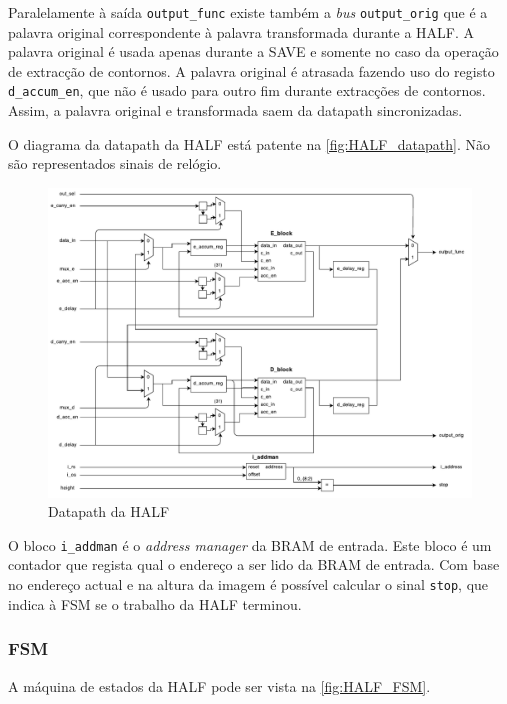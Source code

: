 \documentclass[a4paper]{article}
\begin{document}
Paralelamente à saída \texttt{output\_func} existe também a \textit{bus} \texttt{output\_orig} que é a palavra original correspondente à palavra transformada durante a HALF. A palavra original é usada apenas durante a SAVE e somente no caso da operação de extracção de contornos. A palavra original é atrasada fazendo uso do registo \texttt{d\_accum\_en}, que não é usado para outro fim durante extracções de contornos. Assim, a palavra original e transformada saem da datapath sincronizadas.

O diagrama da datapath da HALF está patente na \autoref{fig:HALF_datapath}. Não são representados sinais de relógio.

\begin{figure}[H]
	\centerline{
		\includegraphics[width=.95\paperwidth]{HALF_datapath}
	}
	\caption{Datapath da HALF}
	\label{fig:HALF_datapath}
\end{figure}

O bloco \texttt{i\_addman} é o \textit{address manager} da BRAM de entrada. Este bloco é um contador que regista qual o endereço a ser lido da BRAM de entrada. Com base no endereço actual e na altura da imagem é possível calcular o sinal \texttt{stop}, que indica à FSM se o trabalho da HALF terminou.

\subsubsection{FSM}
A máquina de estados da HALF pode ser vista na \autoref{fig:HALF_FSM}.
\end{document}

